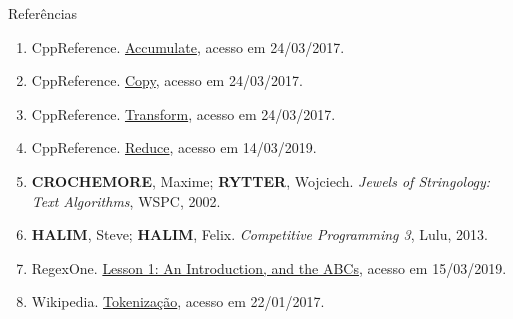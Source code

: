 \begin{frame}[fragile]{Referências}

    \begin{enumerate}
        \item CppReference. \href{http://en.cppreference.com/w/cpp/algorithm/accumulate}{Accumulate},
            acesso em 24/03/2017.

        \item CppReference. \href{http://en.cppreference.com/w/cpp/algorithm/copy}{Copy}, 
            acesso em 24/03/2017.

        \item CppReference. \href{http://en.cppreference.com/w/cpp/algorithm/transform}{Transform}, 
            acesso em 24/03/2017.

        \item CppReference. \href{https://en.cppreference.com/w/cpp/algorithm/reduce}{Reduce},
            acesso em 14/03/2019.

        \item \textbf{CROCHEMORE}, Maxime; \textbf{RYTTER}, Wojciech. \textit{Jewels of Stringology: Text Algorithms}, WSPC, 2002.

        \item \textbf{HALIM}, Steve; \textbf{HALIM}, Felix. \textit{Competitive Programming 3}, Lulu, 2013.

        \item RegexOne. \href{https://regexone.com/}{Lesson 1: An Introduction, and the ABCs}, acesso em 15/03/2019.

        \item Wikipedia. \href{https://en.wikipedia.org/wiki/Tokenization\_(lexical\_analysis)}{Tokenização}, acesso em 22/01/2017.

    \end{enumerate}

\end{frame}
